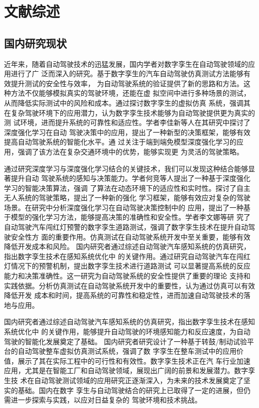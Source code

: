 \section{文献综述}

\subsection{国内研究现状}

近年来，随着自动驾驶技术的迅猛发展，国内学者对数字孪生在自动驾驶领域的应用进行了广
泛而深入的研究。基于数字孪生的汽车自动驾驶仿真测试方法能够有效提升测试的安全性与效率，
为自动驾驶系统的验证提供了新的思路和方法。这种方法不仅能够模拟真实的驾驶环境，还能在虚
拟空间中进行多种场景的测试，从而降低实际测试中的风险和成本。通过探讨数字孪生的虚拟仿真
系统，强调其在复杂驾驶环境下的应用潜力，认为数字孪生技术能够为自动驾驶提供更为真实的测
试环境，进而提升系统的可靠性和适应性。学者李佳新等人在其研究中探讨了深度强化学习在自动
驾驶决策中的应用，提出了一种新型的决策框架，能够有效提高自动驾驶系统的智能化水平。通
过关注于端到端免模型深度强化学习的应用，强调了该方法在复杂交通环境中的优势，能够实现更
为灵活的驾驶策略。

通过研究深度学习与深度强化学习结合的关键技术，我们可以发现这种结合能够显著提升自动
驾驶系统的感知与决策能力。学者何竞等人提出了一种基于深度强化学习的智能决策算法，强调
了算法在动态环境下的适应性和实时性。探讨了自主无人系统的驾驶策略，提出了一种新的强化
学习框架，能够有效应对复杂的驾驶场景。在研究中分析深度强化学习在自动驾驶决策控制中的
应用，提出了一种基于模型的强化学习方法，能够提高决策的准确性和安全性。学者李文娜等研
究了自动驾驶汽车闯红灯预警的数字孪生道路测试，强调了数字孪生技术在提升自动驾驶安全性方
面的重要作用。仿真测试在自动驾驶系统开发中至关重要，能够有效降低开发成本和风险。
国内研究者通过综述自动驾驶汽车感知系统的仿真研究，指出数字孪生技术在感知系统优化中
的关键作用。通过研究自动驾驶汽车在闯红灯情况下的预警机制，提出数字孪生技术进行道路测试
可以显著提高系统的反应能力和决策准确性。这一研究为自动驾驶系统的安全性提供了重要的理论
支持和实践依据。分析仿真测试在自动驾驶系统开发中的重要性，认为通过仿真可以有效降低开发
成本和时间，提高系统的可靠性和稳定性，进而加速自动驾驶技术的落地与应用。

国内研究者通过综述自动驾驶汽车感知系统的仿真研究，指出数字孪生技术在感知系统优化中
的关键作用，能够提升自动驾驶的环境感知能力和反应速度，为自动驾驶的智能化发展奠定了基础。
国内研究者研究设计了一种基于转鼓/制动试验平台的自动驾驶整车虚拟仿真测试系统，强调了数
字孪生在整车测试中的应用价值，展示了其在实际工程中的可行性和有效性。数字孪生技术正在汽
车行业加速应用，尤其是在智能工厂和自动驾驶领域，展现出广阔的前景和发展潜力。数字孪生技
术在自动驾驶测试领域的应用研究正逐渐深入，为未来的技术发展奠定了坚实的基础。国内在数字
孪生与自动驾驶结合的研究上已取得了一定的进展，但仍需进一步探索与实践，以应对日益复杂的
驾驶环境和技术挑战。

